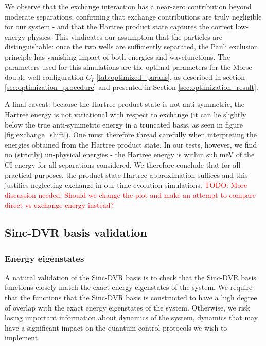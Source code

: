 \documentclass{subfiles}
\begin{document}
We observe that the exchange interaction has a near-zero contribution beyond moderate separations, confirming that exchange contributions are truly negligible for our system - and that the Hartree product state captures the correct low-energy physics. This vindicates our assumption that the particles are distinguishable: once the two wells are sufficiently separated, the Pauli exclusion principle has vanishing impact of both energies and wavefunctions. The parameters used for this simulations are the optimal parameters for the Morse double-well configuration $C_I$ \ref{tab:optimized_parans}, as described in section \ref{sec:optimization_procedure} and presented in Section \ref{sec:optimization_result}. 

A final caveat: because the Hartree product state is not anti-symmetric, the Hartree energy is not variational with respect to exchange (it can lie slightly below the true anti-symmetric energy in a truncated basis, as seen in figure \ref{fig:exchange_shift}). One must therefore thread carefully when interpreting the energies obtained from the Hartree product state. In our tests, however, we find no (strictly) un-physical energies - the Hartree energy is within sub meV of the CI energy for all separations considered. We therefore conclude that for all practical purposes, the product state Hartree approximation suffices and this justifies neglecting exchange in our time-evolution simulations. \textcolor{red}{TODO: More discussion needed. Should we change the plot and make an attempt to compare direct vs exchange energy instead?}



\subsection{Sinc-DVR basis validation}
\subsubsection*{Energy eigenstates}
A natural validation of the Sinc-DVR basis is to check that the Sinc-DVR basis functions closely match the exact energy eigenstates of the system. We require that the functions that the Sinc-DVR basis is constructed to have a high degree of overlap with the exact energy eigenstates of the system. Otherwise, we risk losing important information about dynamics of the system, dynamics that may have a significant impact on the quantum control protocols we wish to implement.\\ 
\end{document}

